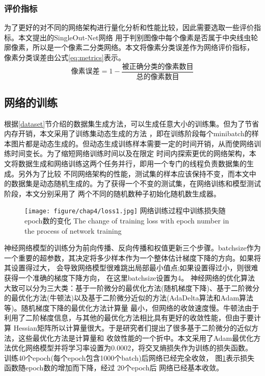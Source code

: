 \subsubsection{评价指标}
	为了更好的对不同的网络架构进行量化分析和性能比较，因此需要选取一些评价指标。本文提出的SingleOut-Net网络
	用于判别图像中每个像素是否属于中央线虫轮廓像素，所以是一个像素二分类网络。本文将像素分类误差作为网络评价指标，
	像素分类误差由公式\ref{eq:metrics}表示。
	\begin{equation}
		\text{像素误差} =1- \frac{\text{被正确分类的像素数目}}{\text{总的像素数目}} \label{eq:metrics}
	\end{equation}
\subsection{网络的训练}
	
	根据\ref{dataset}节介绍的数据集生成方法，可以生成任意大小的训练集。但为了节省内存开销，本文采用了训练集动态生成的方法
	，即在训练阶段每个minibatch的样本图片都是动态生成的。但动态生成训练样本需要一定的时间开销，从而使网络训练时间变长。为了缩短网络训练时间以及在限定
	时间内探索更优的网络架构，本文将数据生成和网络训练这两个任务并行，即用一个专门的线程负责数据集的生成。另外为了比较
	不同网络架构的性能，测试集的样本应该保持不变，而本文中的数据集是动态随机生成的。为了获得一个不变的测试集，在网络训练和模型测试阶段，本文分别采用了
	两个不同的随机数种子初始化随机数生成器。
		\begin{figure}[!b]
	  \centering
	  \texttt{[image: figure/chap4/loss1.jpg]}
	  \bicaption
		{网络训练过程中训练损失随epoch数的变化}
		{The change of training loss with epoch number in the process of network training}
	  \label{fig:chap4:loss}
	\end{figure}
	
	神经网络模型的训练分为前向传播、反向传播和权值更新三个步骤。batchsize作为一个重要的超参数，其决定将多少样本作为一个整体估计梯度下降的方向。如果将其设置得过大，
	会导致网络模型很难跳出局部最小值点;如果设置得过小，则很难获得一个准确的梯度下降方向，
	在这里batchsize设置为4。
	神经网络的优化算法大致可以分为三大类：基于一阶微分的最优化方法(随机梯度下降)、基于二阶微分
	的最优化方法(牛顿法)以及基于二阶微分近似的方法(AdaDelta算法\cite{zeiler2012adadelta}和Adam算法\cite{kinga2015method}等)。随机梯度下降的最优化方法计算量
	最小，但网络的收敛速度慢。牛顿法由于利用了二阶梯度信息，与其他的最优化方法相比具有更好的收敛性能，但由于要计算
	Hessian矩阵所以计算量很大。于是研究者们提出了很多基于二阶微分的近似方法，这些最优化方法是计算量和
	收敛性能的一个折中。本文采用了Adam最优化方法优化网络模型并将学习率设置为0.0002，将交叉熵损失作为训练的损失函数。
	训练40个epoch(每个epoch包含1000个batch)后网络已经完全收敛，
	图\ref{fig:chap4:loss}表示损失函数随epoch数的增加而下降，经过 20个epoch后
	网络已经基本收敛。

